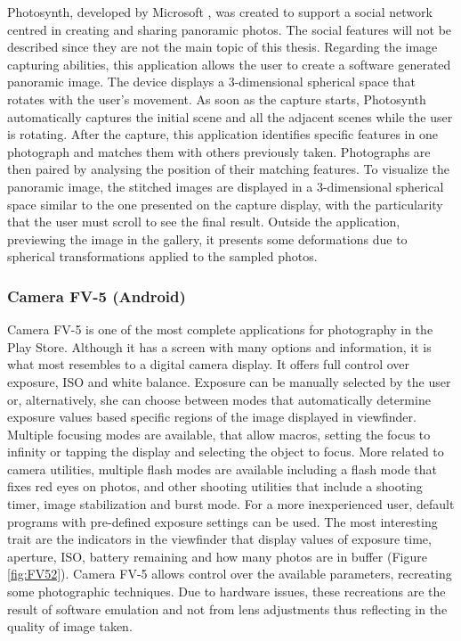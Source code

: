 Photosynth, developed by Microsoft \cite{Photosynth}, was created to support a social network centred in creating and sharing panoramic photos. The social features will not be described since they are not the main topic of this thesis.
Regarding the image capturing abilities, this application allows the user to create a software generated panoramic image. The device displays a 3-dimensional spherical space that rotates with the user's movement. As soon as the capture starts, Photosynth automatically captures the initial scene and all the adjacent scenes while the user is rotating. After the capture, this application identifies specific features in one photograph and matches them with others previously taken. Photographs are then paired by analysing the position of their matching features. 
To visualize the panoramic image, the stitched images are displayed in a 3-dimensional spherical space similar to the one presented on the capture display, with the particularity that the user must scroll to see the final result. Outside the application, previewing the image in the gallery, it presents some deformations due to spherical transformations applied to the sampled photos. 


\subsubsection{Camera FV-5 (Android)}

Camera FV-5 \cite{FV5} is one of the most complete applications for photography in the Play Store. Although it has a screen with many options and information, it is what most resembles to a digital camera display. It offers full control over exposure, ISO and white balance. Exposure can be manually selected by the user or, alternatively, she can choose between modes that automatically determine exposure values based specific regions of the image displayed in viewfinder. 
Multiple focusing modes are available, that allow macros, setting the focus to infinity or tapping the display and selecting the object to focus.
More related to camera utilities, multiple flash modes are available including a flash mode that fixes red eyes on photos, and other shooting utilities that include a shooting timer, image stabilization and burst mode.
For a more inexperienced user, default programs with pre-defined exposure settings can be used.
The most interesting trait are the indicators in the viewfinder that display values of exposure time, aperture, ISO, battery remaining and how many photos are in buffer (Figure \ref{fig:FV52}).
Camera FV-5 allows control over the available parameters, recreating some photographic techniques. Due to hardware issues, these recreations are the result of software emulation and not from lens adjustments thus reflecting in the quality of image taken.

